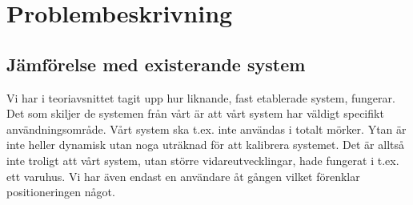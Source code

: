 \documentclass[11pt, a4paper]{report}
\begin{document}


\section{Problembeskrivning}
\subsection{Jämförelse med existerande system}
Vi har i teoriavsnittet tagit upp hur liknande, fast etablerade system, fungerar. Det som skiljer de systemen från vårt är att vårt system har väldigt specifikt användningsområde. Vårt system ska t.ex. inte användas i totalt mörker. Ytan är inte heller dynamisk utan noga uträknad för att kalibrera systemet. Det är alltså inte troligt att vårt system, utan större vidareutvecklingar, hade fungerat i t.ex. ett varuhus. Vi har även endast en användare åt gången vilket förenklar positioneringen något.
\end{document}
